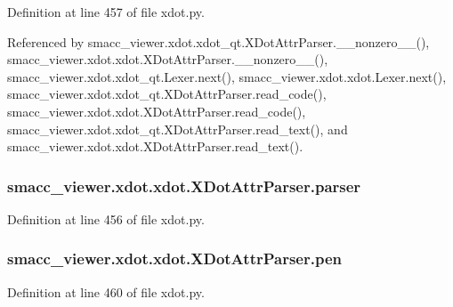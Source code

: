 Definition at line 457 of file xdot.\+py.



Referenced by smacc\+\_\+viewer.\+xdot.\+xdot\+\_\+qt.\+X\+Dot\+Attr\+Parser.\+\_\+\+\_\+nonzero\+\_\+\+\_\+(), smacc\+\_\+viewer.\+xdot.\+xdot.\+X\+Dot\+Attr\+Parser.\+\_\+\+\_\+nonzero\+\_\+\+\_\+(), smacc\+\_\+viewer.\+xdot.\+xdot\+\_\+qt.\+Lexer.\+next(), smacc\+\_\+viewer.\+xdot.\+xdot.\+Lexer.\+next(), smacc\+\_\+viewer.\+xdot.\+xdot\+\_\+qt.\+X\+Dot\+Attr\+Parser.\+read\+\_\+code(), smacc\+\_\+viewer.\+xdot.\+xdot.\+X\+Dot\+Attr\+Parser.\+read\+\_\+code(), smacc\+\_\+viewer.\+xdot.\+xdot\+\_\+qt.\+X\+Dot\+Attr\+Parser.\+read\+\_\+text(), and smacc\+\_\+viewer.\+xdot.\+xdot.\+X\+Dot\+Attr\+Parser.\+read\+\_\+text().

\subsubsection[{\texorpdfstring{parser}{parser}}]{\setlength{\rightskip}{0pt plus 5cm}smacc\+\_\+viewer.\+xdot.\+xdot.\+X\+Dot\+Attr\+Parser.\+parser}\hypertarget{classsmacc__viewer_1_1xdot_1_1xdot_1_1XDotAttrParser_a42de54e2236f0efd3c021fcef2e69b81}{}\label{classsmacc__viewer_1_1xdot_1_1xdot_1_1XDotAttrParser_a42de54e2236f0efd3c021fcef2e69b81}


Definition at line 456 of file xdot.\+py.

\subsubsection[{\texorpdfstring{pen}{pen}}]{\setlength{\rightskip}{0pt plus 5cm}smacc\+\_\+viewer.\+xdot.\+xdot.\+X\+Dot\+Attr\+Parser.\+pen}\hypertarget{classsmacc__viewer_1_1xdot_1_1xdot_1_1XDotAttrParser_aae80bcd7ba2a33502b1148b1bf4e2130}{}\label{classsmacc__viewer_1_1xdot_1_1xdot_1_1XDotAttrParser_aae80bcd7ba2a33502b1148b1bf4e2130}


Definition at line 460 of file xdot.\+py.




